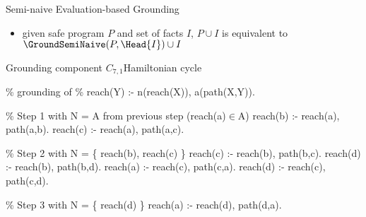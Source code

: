 \begin{frame}{Semi-naive Evaluation-based Grounding}
  \vfill
  \begin{itemize}
    \item given safe program \(P\) and set of facts \(I\), \(P \cup I\) is equivalent to \(\GroundSemiNaive(P,\Head{I}) \cup I\)
  \end{itemize}
\end{frame}
\begin{frame}[fragile]{Grounding component \(C_{7,1}\)}{Hamiltonian cycle}

\begin{SemiVerbatim}[\small]{.9}
{\color{comment}\% grounding of
\% reach(Y) :- {n(reach(X))}, a(path(X,Y)).}

{\color{comment}\% Step 1 with N = A from previous step (reach(a)\({}\in{}\)A)}
\alert{reach(b)} :- \alert{reach(a)}\only<1>{)}, path(a,b).
\alert{reach(c)} :- \alert{reach(a)}, path(a,c).

{\color{comment}\% Step 2 with N = \{ reach(b), reach(c) \}}
reach(c) :- \alert{reach(b)}\only<1>{)}, path(b,c).
\alert{reach(d)} :- \alert{reach(b)}, path(b,d).
reach(a) :- \alert{reach(c)}, path(c,a).
\alert{reach(d)} :- \alert{reach(c)}, path(c,d).

{\color{comment}\% Step 3 with N = \{ reach(d) \}}
reach(a) :- \alert{reach(d)}\only<1>{)}, path(d,a).

\end{SemiVerbatim}
\end{frame}
